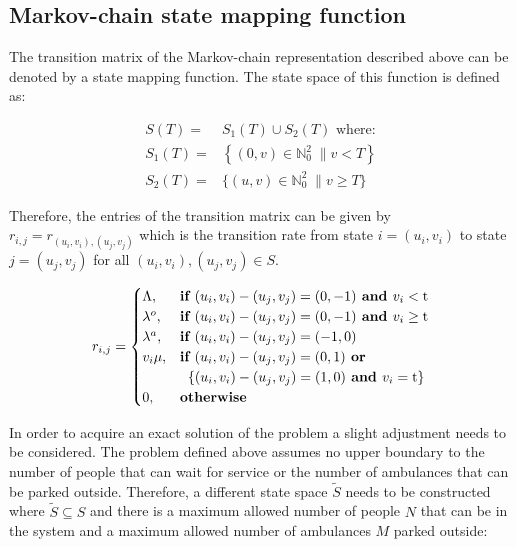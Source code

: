 \documentclass{article}
\begin{document}
\subsection{Markov-chain state mapping function}
The transition matrix of the Markov-chain representation described above can be denoted by a state mapping function. The state space of this function is defined as:



\begin{align}
    S(T) =& S_1(T) \cup S_2(T) \text{ where:} \nonumber \\
    S_1(T) =& \left\{(0, v)\in\mathbb{N}_0^2 \; \| v < T \right\} \\
    S_2(T) =& \{(u, v)\in\mathbb{N}_0^2 \; \| v \geq T \} \nonumber
\end{align}

Therefore, the entries of the transition matrix can be given by $r_{i,j} = r_{(u_i, v_i),(u_j, v_j)}$ which is the transition rate from state $i = (u_i, v_i)$ to state $j = (u_j , v_j)$ for all $(u_i, v_i), (u_j, v_j) \in S$.

\begin{equation}
    r_{i, j} = 
    \begin{cases}
        \Lambda, & \textbf{if } (u_i,v_i) - (u_j, v_j) = (0,-1) \textbf{ and } v_i < \text{t} \\
        \lambda^o, & \textbf{if } (u_i,v_i) - (u_j, v_j) = (0,-1) \textbf{ and } v_i \geq \text{t} \\
        \lambda^a, & \textbf{if } (u_i,v_i) - (u_j, v_j) = (-1,0) \\
        v_i \mu, & \textbf{if } (u_i,v_i) - (u_j, v_j) = (0,1) \textbf{ or } \\
        & \hspace{0.2cm} \{(u_i,v_i) - (u_j, v_j) = (1,0) \textbf{ and } v_i = \text{t}\} \\
        0, & \textbf{otherwise}
    \end{cases}
\end{equation}

In order to acquire an exact solution of the problem a slight adjustment needs to be considered. The problem defined above assumes no upper boundary to the number of people that can wait for service or the number of ambulances that can be parked outside. Therefore, a different state space $\tilde S$ needs to be constructed where $\tilde S \subseteq S $ and there is a maximum allowed number of people $N$ that can be in the system and a maximum allowed number of ambulances $M$ parked outside:
\end{document}
